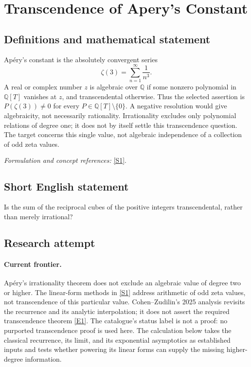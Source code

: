 \documentclass[11pt,a4paper]{article}
\newcommand{\Q}{\mathbb{Q}}
\newcommand{\sref}[2]{\hyperlink{source:#1:#2}{[S#2]}}
\newcommand{\eref}[2]{\hyperlink{extra:#1:#2}{[E#2]}}
\newif\ifshowcatalogue
\newcommand{\cataloguescope}[1]{\ifshowcatalogue
 \paragraph{Exact scope in the supplied catalogue.}
 \begin{quote}\small #1\end{quote}\fi}
\numberwithin{equation}{section}
\begin{document}
\setcounter{section}{183}
\clearpage
\section{\texorpdfstring{Transcendence of Apery's Constant}{Transcendence of Apery's Constant}}\label{184}
\subsection{Definitions and mathematical statement}
Ap\'ery's constant is the absolutely convergent series
\[
 \zeta(3)=\sum_{n=1}^{\infty}\frac1{n^3}.
\]
A real or complex number $z$ is algebraic over $\Q$ if some nonzero polynomial in $\Q[T]$ vanishes at $z$, and transcendental otherwise. Thus the selected assertion is
$P(\zeta(3))\ne0$ for every $P\in\Q[T]\setminus\{0\}$.
A negative resolution would give algebraicity, not necessarily rationality. Irrationality excludes only polynomial relations of degree one; it does not by itself settle this transcendence question. The target concerns this single value, not algebraic independence of a collection of odd zeta values.
\par\smallskip\textit{Formulation and concept references:} \sref{184}{1}.
\cataloguescope{Prove or disprove that the value zeta(3) is transcendental over the rational numbers.}
\subsection{Short English statement}
Is the sum of the reciprocal cubes of the positive integers transcendental, rather than merely irrational?
\subsection{Research attempt}

\paragraph{Current frontier.}
Ap\'ery's irrationality theorem does not exclude an algebraic value of degree two or higher. The linear-form methods in \sref{184}{1} address arithmetic of odd zeta values, not transcendence of this particular value. Cohen--Zudilin's 2025 analysis revisits the recurrence and its analytic interpolation; it does not assert the required transcendence theorem \eref{184}{1}. The catalogue's status label is not a proof: no purported transcendence proof is used here. The calculation below takes the classical recurrence, its limit, and its exponential asymptotics as established inputs and tests whether powering its linear forms can supply the missing higher-degree information.
\end{document}
